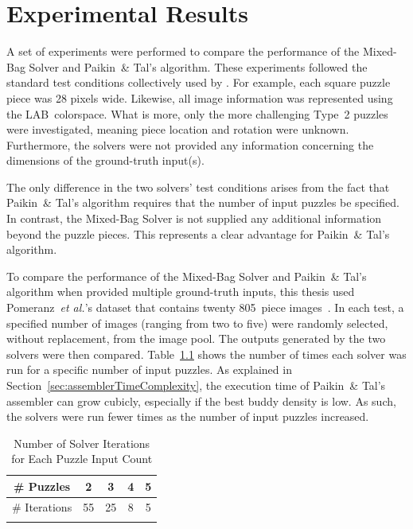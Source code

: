 \chapter{Experimental Results}\label{chap:experimentalResults}

A set of experiments were performed to compare the performance of the Mixed-Bag Solver and Paikin~\& Tal's algorithm.  These experiments followed the standard test conditions collectively used by \cite{cho2010, pomeranz2011, gallagher2012, sholomon2013, paikin2015}.  For example, each square puzzle piece was 28 pixels wide.  Likewise, all image information was represented using the LAB~colorspace.  What is more, only the more challenging Type~2 puzzles were investigated, meaning piece location and rotation were unknown.  Furthermore, the solvers were not provided any information concerning the dimensions of the ground-truth input(s).

The only difference in the two solvers' test conditions arises from the fact that Paikin~\& Tal's algorithm requires that the number of input puzzles be specified. In contrast, the Mixed-Bag Solver is not supplied any additional information beyond the puzzle pieces.  This represents a clear advantage for Paikin~\& Tal's algorithm.

To compare the performance of the Mixed-Bag Solver and Paikin~\& Tal's algorithm when provided multiple ground-truth inputs, this thesis used Pomeranz~\textit{et al.}'s dataset that contains twenty 805~piece images~\cite{pomeranzBenchmarkImages}.  In each test, a specified number of images (ranging from two to five) were randomly selected, without replacement, from the image pool.  The outputs generated by the two solvers were then compared.  Table~\ref{tab:numberSolverIterations} shows the number of times each solver was run for a specific number of input puzzles. As explained in Section~\ref{sec:assemblerTimeComplexity}, the execution time of Paikin~\& Tal's assembler can grow cubicly, especially if the best buddy density is low.  As such, the solvers were run fewer times as the number of input puzzles increased.

\begin{table}[tb]
\begin{center}
\begin{tabular}{ |c||c|c|c|c| } 
 \Xhline{1pt}
 \# Puzzles    &  2 &  3 & 4 & 5 \\ 
\hline \hline
 \# Iterations & 55 & 25 & 8 & 5 \\ 
 \Xhline{1pt}
\end{tabular}
\end{center}
\caption{Number of Solver Iterations for Each Puzzle Input Count}\label{tab:numberSolverIterations}
\end{table}

